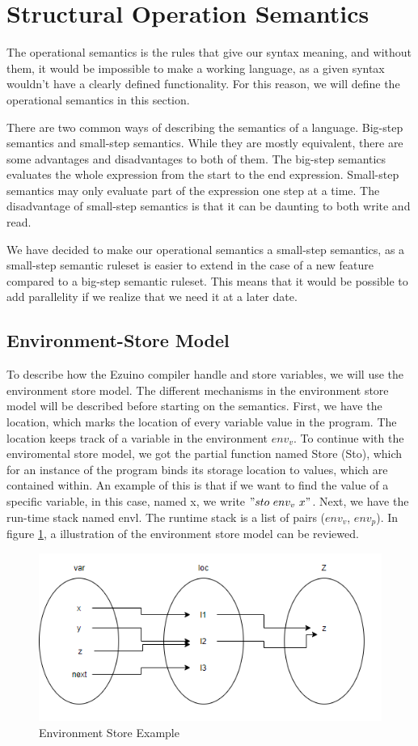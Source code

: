 \section{Structural Operation Semantics}
The operational semantics is the rules that give our syntax meaning, and without them, it would be impossible to make a working language, as a given syntax wouldn't have a clearly defined functionality. For this reason, we will define the operational semantics in this section.

There are two common ways of describing the semantics of a language. Big-step semantics and small-step semantics. While they are mostly equivalent, there are some advantages and disadvantages to both of them. The big-step semantics evaluates the whole expression from the start to the end expression. Small-step semantics may only evaluate part of the expression one step at a time. The disadvantage of small-step semantics is that it can be daunting to both write and read.

We have decided to make our operational semantics a small-step semantics, as a small-step semantic ruleset is easier to extend in the case of a new feature compared to a big-step semantic ruleset. This means that it would be possible to add parallelity if we realize that we need it at a later date.

\subsection{Environment-Store Model}
To describe how the Ezuino compiler handle and store variables, we will use the environment store model. The different mechanisms in the environment store model will be described before starting on the semantics. First, we have the location, which marks the location of every variable value in the program. The location keeps track of a variable in the environment $env_v$.
To continue with the enviromental store model, we got the partial function named Store (Sto), which for an instance of the program binds its storage location to values, which are contained within. An example of this is that if we want to find the value of a specific variable, in this case, named x, we write $"sto \ env_v \ x"$.
Next, we have the run-time stack named envl. The runtime stack is a list of pairs ($env_v$, $env_p$).
In figure \ref{evnstoreexmp}, a illustration of the environment store model can be reviewed.
\begin{figure}[H]
\centering
\includegraphics[scale=0.75]{figures/evnstore.png}
\caption{Environment Store Example}
\label{evnstoreexmp}
\end{figure}




